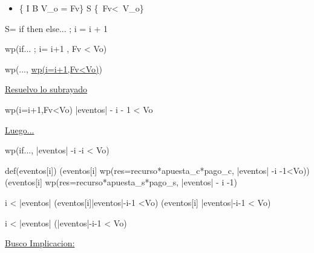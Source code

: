 \begin{itemize}
    \item\{{ I \wedge  B \wedge  V_o =  Fv\} S \{\ Fv<\ V_o\}
    }
\end{itemize}
\vspace{0.3cm}

S= if then else... ; i = i + 1

\vspace{0.3cm}

\equiv  wp(if... ; i= i+1 , Fv < Vo)

\vspace{0.3cm}

\equiv wp(..., \underline{wp(i=i+1,Fv<Vo)})  

\vspace{0.3cm}

\underline{Resuelvo lo subrayado}

\vspace{0.3cm}

 \equiv wp(i=i+1,Fv<Vo) \equiv |eventos| - i - 1 < Vo

\vspace{0.3cm}

\underline{Luego...}

\vspace{0.3cm}


\equiv wp(if..., |eventos| -i -i < Vo)

\vspace{0.3cm}

\vspace{0.3cm}

\equiv def(eventos[i]) \yLuego (eventos[i] \wedge wp(res=recurso*apuesta_c*pago_c, |eventos| -i -1<Vo))\\
\phantom{.} \hspace{15} \vee (\neg eventos[i] \wedge wp(res=recurso*apuesta_s*pago_s, |eventos| - i -1)

\vspace{0.3cm}

 \leq i < |eventos| \yLuego (eventos[i]\wedge |eventos|-i-1 <Vo) \vee (\neg eventos[i] \wedge |eventos|-i-1 < Vo)

\vspace{0.3cm}

\leq i < |eventos| \yLuego (|eventos|-i-1 < Vo)

\vspace{0.8cm}

 \underline{Busco Implicacion:}

